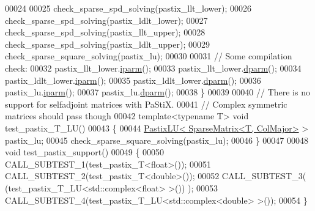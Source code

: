 \begin{DoxyCode}
00024 
00025   check\_sparse\_spd\_solving(pastix\_llt\_lower);
00026   check\_sparse\_spd\_solving(pastix\_ldlt\_lower);
00027   check\_sparse\_spd\_solving(pastix\_llt\_upper);
00028   check\_sparse\_spd\_solving(pastix\_ldlt\_upper);
00029   check\_sparse\_square\_solving(pastix\_lu);
00030 
00031   \textcolor{comment}{// Some compilation check:}
00032   pastix\_llt\_lower.\hyperlink{class_eigen_1_1_pastix_base_a38378e7b2b5c750a8a23e2c21a69146c}{iparm}();
00033   pastix\_llt\_lower.\hyperlink{class_eigen_1_1_pastix_base_af4a29373aa3e6a980738efde33f92a76}{dparm}();
00034   pastix\_ldlt\_lower.\hyperlink{class_eigen_1_1_pastix_base_a38378e7b2b5c750a8a23e2c21a69146c}{iparm}();
00035   pastix\_ldlt\_lower.\hyperlink{class_eigen_1_1_pastix_base_af4a29373aa3e6a980738efde33f92a76}{dparm}();
00036   pastix\_lu.\hyperlink{class_eigen_1_1_pastix_base_a38378e7b2b5c750a8a23e2c21a69146c}{iparm}();
00037   pastix\_lu.\hyperlink{class_eigen_1_1_pastix_base_af4a29373aa3e6a980738efde33f92a76}{dparm}();
00038 \}
00039 
00040 \textcolor{comment}{// There is no support for selfadjoint matrices with PaStiX. }
00041 \textcolor{comment}{// Complex symmetric matrices should pass though}
00042 \textcolor{keyword}{template}<\textcolor{keyword}{typename} T> \textcolor{keywordtype}{void} test\_pastix\_T\_LU()
00043 \{
00044   \hyperlink{class_eigen_1_1_pastix_l_u}{PastixLU< SparseMatrix<T, ColMajor>} > pastix\_lu;
00045   check\_sparse\_square\_solving(pastix\_lu);
00046 \}
00047 
00048 \textcolor{keywordtype}{void} test\_pastix\_support()
00049 \{
00050   CALL\_SUBTEST\_1(test\_pastix\_T<float>());
00051   CALL\_SUBTEST\_2(test\_pastix\_T<double>());
00052   CALL\_SUBTEST\_3( (test\_pastix\_T\_LU<std::complex<float> >()) );
00053   CALL\_SUBTEST\_4(test\_pastix\_T\_LU<std::complex<double> >());
00054 \} 
\end{DoxyCode}
